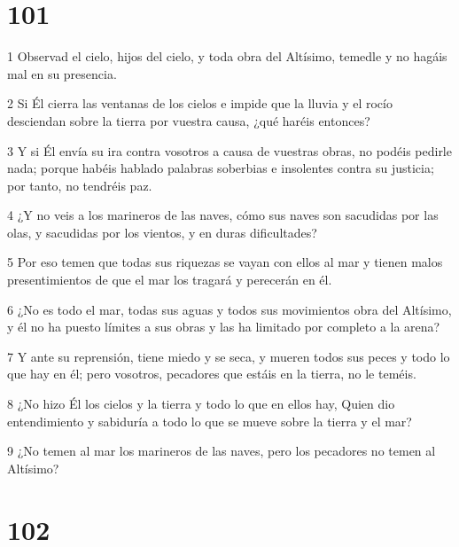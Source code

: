 \chapter{101}

\par 1 Observad el cielo, hijos del cielo, y toda obra del Altísimo, temedle y no hagáis mal en su presencia.
\par 2 Si Él cierra las ventanas de los cielos e impide que la lluvia y el rocío desciendan sobre la tierra por vuestra causa, ¿qué haréis entonces?
\par 3 Y si Él envía su ira contra vosotros a causa de vuestras obras, no podéis pedirle nada; porque habéis hablado palabras soberbias e insolentes contra su justicia; por tanto, no tendréis paz.
\par 4 ¿Y no veis a los marineros de las naves, cómo sus naves son sacudidas por las olas, y sacudidas por los vientos, y en duras dificultades?
\par 5 Por eso temen que todas sus riquezas se vayan con ellos al mar y tienen malos presentimientos de que el mar los tragará y perecerán en él.
\par 6 ¿No es todo el mar, todas sus aguas y todos sus movimientos obra del Altísimo, y él no ha puesto límites a sus obras y las ha limitado por completo a la arena?
\par 7 Y ante su reprensión, tiene miedo y se seca, y mueren todos sus peces y todo lo que hay en él; pero vosotros, pecadores que estáis en la tierra, no le teméis.
\par 8 ¿No hizo Él los cielos y la tierra y todo lo que en ellos hay, Quien dio entendimiento y sabiduría a todo lo que se mueve sobre la tierra y el mar?
\par 9 ¿No temen al mar los marineros de las naves, pero los pecadores no temen al Altísimo?

\chapter{102}

